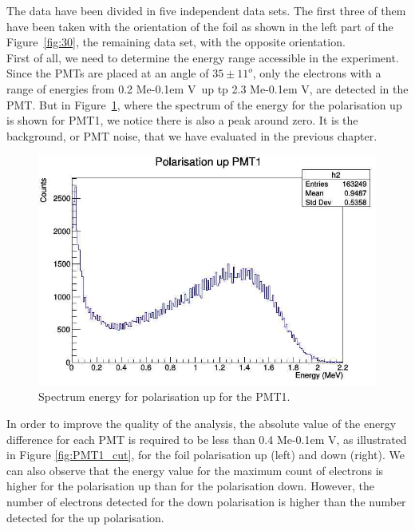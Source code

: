 \documentclass[10pt,swedish, openany]{book}
\def\MeV{\ifmmode {\mathrm{\ Me\kern -0.1em V}}\else
                   \textrm{Me\kern -0.1em V}\fi}%
\begin{document}
The data have been divided in five independent data sets. The first three of them have been taken with the orientation of the foil as shown in the left part of the Figure~\ref{fig:30}, the remaining data set, with the opposite orientation.\\

First of all, we need to determine the energy range accessible in the experiment. Since the PMTs are placed at an angle of $35\pm 11 ^o$, only the electrons with a range of energies from 0.2 \MeV~up tp 2.3 \MeV, are detected in the PMT. But in Figure~\ref{fig:up}, where the spectrum of the energy for the polarisation up is shown for PMT1, we notice there is also a peak around zero. It is the background, or PMT noise, that we have evaluated in the previous chapter. 

\begin{figure}[H]
\includegraphics[scale=0.3]{upPMT1.jpg}
\centering
\caption{Spectrum energy for polarisation up for the PMT1.}
\label{fig:up}
\end{figure}

In order to improve the quality of the analysis, the absolute value of the energy difference for each PMT is required to be less than 0.4 \MeV, as illustrated in Figure \ref{fig:PMT1_cut}, for the foil polarisation up (left) and down (right). We can also observe that the energy value for the maximum count of electrons is higher for the polarisation up than for the polarisation down. However, the number of electrons detected for the down polarisation is higher than the number detected for the up polarisation.
\end{document}
